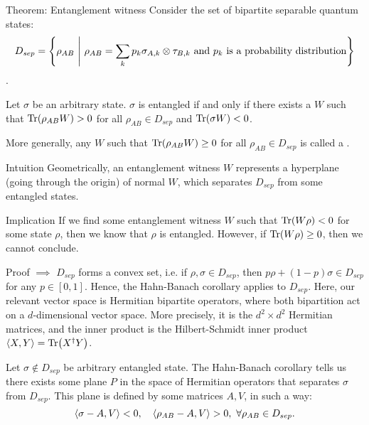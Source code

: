 \documentclass[a4paper]{article}
\begin{document}
\begin{parag}{Theorem: Entanglement witness}
    Consider the set of bipartite separable quantum states:
    \[D_{sep} = \left\{\rho_{AB} \suchthat \rho_{AB} = \sum_{k} p_k \sigma_{A, k} \otimes \tau_{B, k} \text{ and $p_k$ is a probability distribution}\right\}\].

    Let $\sigma$ be an arbitrary state. $\sigma$ is entangled if and only if there exists a $W$ such that $\Tr\left(\rho_{AB} W\right) > 0$ for all $\rho_{AB} \in D_{sep}$ and $\Tr\left(\sigma W\right) < 0$.

    More generally, any $W$ such that $\Tr\left(\rho_{AB} W\right) \geq 0$ for all $\rho_{AB} \in D_{sep}$ is called a .

    \begin{subparag}{Intuition}
        Geometrically, an entanglement witness $W$ represents a hyperplane (going through the origin) of normal $W$, which separates $D_{sep}$ from some entangled states.
    \end{subparag}

    \begin{subparag}{Implication}
        If we find some entanglement witness $W$ such that $\Tr\left(W \rho\right) < 0$ for some state $\rho$, then we know that $\rho$ is entangled. However, if $\Tr\left(W \rho\right) \geq 0$, then we cannot conclude.
    \end{subparag}

    \begin{subparag}{Proof $\implies$}
        $D_{sep}$ forms a convex set, i.e. if $\rho, \sigma \in D_{sep}$, then $p  \rho + \left(1-p\right)\sigma \in D_{sep}$ for any $p \in \left[0, 1\right]$. Hence, the Hahn-Banach corollary applies to $D_{sep}$. Here, our relevant vector space is Hermitian bipartite operators, where both bipartition act on a $d$-dimensional vector space. More precisely, it is the $d^2 \times d^2$ Hermitian matrices, and the inner product is the Hilbert-Schmidt inner product $\left\langle X, Y \right\rangle = \Tr\left(X^{\dagger} Y\right)$. 

        Let $\sigma \not\in D_{sep}$ be arbitrary entangled state. The Hahn-Banach corollary tells us there exists some plane $P$ in the space of Hermitian operators that separates $\sigma$ from $D_{sep}$. This plane is defined by some matrices $A, V$, in such a way:
        \[\left\langle \sigma - A, V \right\rangle < 0, \mathspace \left\langle \rho_{AB}- A, V \right\rangle > 0,\  \forall \rho_{AB} \in D_{sep}.\]


\end{subparag}
\end{parag}
\end{document}
